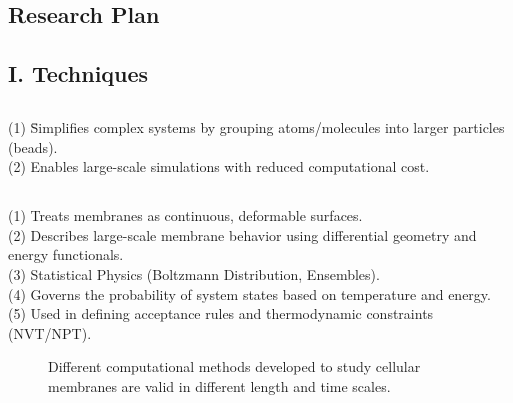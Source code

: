 \documentclass[12pt]{article}
\begin{document}
\begin{flushleft}
\vspace{-1em} 
\section*{Research Plan}
\vspace{-1em}
\subsection*{I. Techniques}
 \subsection*{}
\begin{tabbing}
\indent\indent	(1) \= Simplifies complex systems by grouping atoms/molecules into larger particles (beads).\\
\indent\indent	(2) \> Enables large-scale simulations with reduced computational cost.
\end{tabbing}



\subsection* {}
\begin{tabbing}
 \indent \indent    (1) Treats membranes as continuous, deformable surfaces.\\

 \indent  \indent   (2) Describes large-scale membrane behavior using differential geometry and energy functionals.\\

\indent  \indent (3) Statistical Physics (Boltzmann Distribution, Ensembles).\\

 \indent  \indent    (4) Governs the probability of system states based on temperature and energy.\\

  \indent \indent  (5)   Used in defining acceptance rules and thermodynamic constraints (NVT/NPT).
\end{tabbing}



\begin{figure}[!ht]
  \centering
  \caption{Different computational methods developed to study cellular membranes are valid in different length and time scales.\cite{chabanon2017systems}}
\end{figure}



\end{flushleft}
\end{document}
